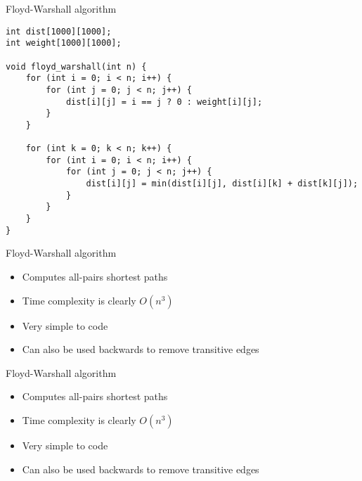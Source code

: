 \documentclass[12pt,t]{beamer}
\newcommand{\bi}{\begin{itemize}}
\newcommand{\ei}{\end{itemize}}
\begin{document}
\begin{frame}[fragile]{Floyd-Warshall algorithm}
    \begin{verbatim}
int dist[1000][1000];
int weight[1000][1000];

void floyd_warshall(int n) {
    for (int i = 0; i < n; i++) {
        for (int j = 0; j < n; j++) {
            dist[i][j] = i == j ? 0 : weight[i][j];
        }
    }

    for (int k = 0; k < n; k++) {
        for (int i = 0; i < n; i++) {
            for (int j = 0; j < n; j++) {
                dist[i][j] = min(dist[i][j], dist[i][k] + dist[k][j]);
            }
        }
    }
}
    \end{verbatim}
\end{frame}

\begin{frame}{Floyd-Warshall algorithm}
    \vspace{40pt}
    \bi
\item Computes all-pairs shortest paths
\item Time complexity is clearly $O(n^3)$
\item Very simple to code
    \vspace{10pt}
\item Can also be used backwards to remove transitive edges
    \ei
\end{frame}


\begin{frame}{Floyd-Warshall algorithm}
    \vspace{40pt}
    \bi
\item Computes all-pairs shortest paths
\item Time complexity is clearly $O(n^3)$
\item Very simple to code
    \vspace{10pt}
\item Can also be used backwards to remove transitive edges
    \ei
\end{frame}
\end{document}
